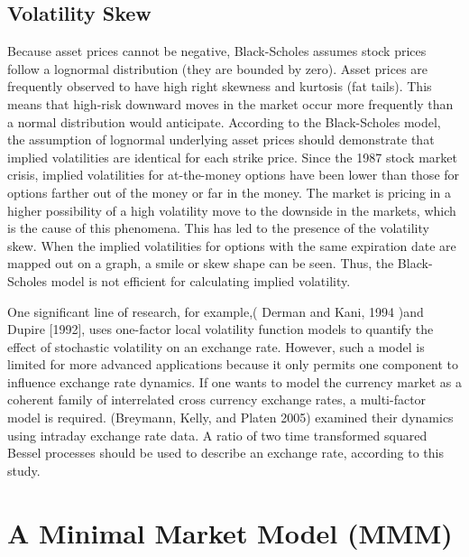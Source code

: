 \documentclass[a4 paper, 12pt]{report}
\theoremstyle{plain}
\begin{document}
\subsection{Volatility Skew}
\noindent
\par Because asset prices cannot be negative, Black-Scholes assumes stock prices follow a
lognormal distribution (they are bounded by zero). Asset prices are frequently observed
to have high right skewness and kurtosis (fat tails). This means that high-risk downward
moves in the market occur more frequently than a normal distribution would anticipate.
According to the Black-Scholes model, the assumption of lognormal underlying asset
prices should demonstrate that implied volatilities are identical for each strike price.
Since the 1987 stock market crisis, implied volatilities for at-the-money options have
been lower than those for options farther out of the money or far in the money. The
market is pricing in a higher possibility of a high volatility move to the downside in the
markets, which is the cause of this phenomena. This has led to the presence of the
volatility skew. When the implied volatilities for options with the same expiration date
are mapped out on a graph, a smile or skew shape can be seen. Thus, the Black-Scholes
model is not efficient for calculating implied volatility.\\
\par One significant line of research, for example,( Derman and Kani, 1994 )and Dupire [1992], uses one-factor local volatility function models to quantify the effect of stochastic
volatility on an exchange rate. However, such a model is limited for more advanced applications because it only permits one component to influence exchange rate
dynamics. If one wants to model the currency market as a coherent family of interrelated
cross currency exchange rates, a multi-factor model is required. (Breymann, Kelly, and
Platen 2005) examined their dynamics using intraday exchange rate data. A ratio of two
time transformed squared Bessel processes should be used to describe an exchange rate,
according to this study.
\section{A Minimal Market Model (MMM)}
\end{document}
